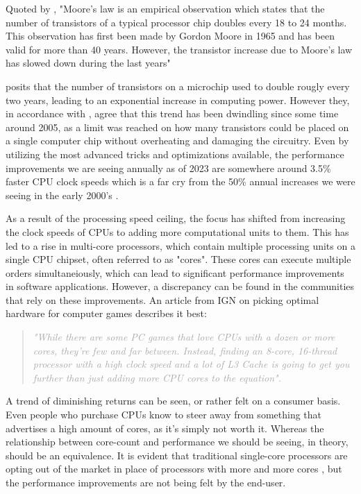 \documentclass[12pt,a4paper]{article}
\begin{document}
Quoted by \cite{Rauber2023}, "Moore’s law is an empirical
observation which states that the number of transistors of a typical processor chip
doubles every 18 to 24 months. This observation has first been made by Gordon
Moore in 1965 and has been valid for more than 40 years. However, the transistor
increase due to Moore’s law has slowed down during the last years" 

\citeauthor{Rauber2023} posits that the number of transistors on a microchip used to double rougly every two years, leading to an exponential increase in computing power. However they, in accordance with \cite{Mattson2014}, agree that this trend has been dwindling since some time around 2005, as a limit was reached on how many transistors could be placed on a single computer chip without overheating and damaging the circuitry. Even by utilizing the most advanced tricks and optimizations available, the performance improvements we are seeing annually as of 2023 are somewhere around 3.5\% faster CPU clock speeds \parencite[p. 11]{Rauber2023} which is a far cry from the 50\% annual increases we were seeing in the early 2000's \parencite[p. 11]{Rauber2023}. 

As a result of the processing speed ceiling, the focus has shifted from increasing the clock speeds of CPUs to adding more computational units to them. This has led to a rise in multi-core processors, which contain multiple processing units on a single CPU chipset, often referred to as "cores". These cores can execute multiple orders simultaneiously, which can lead to significant performance improvements in software applications. However, a discrepancy can be found in the communities that rely on these improvements. An article from IGN \parencite{Thomas2025} on picking optimal hardware for computer games describes it best:

\begin{quote}
    \textit{\textcolor{darkgray}{"While there are some PC games that love CPUs with a dozen or more cores, they’re few and far between. 
    Instead, finding an 8-core, 16-thread processor with a high clock speed and a lot of L3 Cache is going to get you further than just adding more CPU cores to the equation". }}
\end{quote}

A trend of diminishing returns can be seen, or rather felt on a consumer basis. Even people who purchase CPUs know to steer away from something that advertises a high amount of cores, as it's simply not worth it. Whereas the relationship between core-count and performance we should be seeing, in theory, should be an equivalence. It is evident that traditional single-core processors are opting out of the market in place of processors with more and more cores \parencite{Smith2023}, but the performance improvements are not being felt by the end-user.
\end{document}
